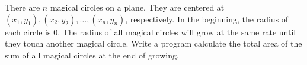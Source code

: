 There are $n$ magical circles on a plane. 
They are centered at $(x_1,y_1), (x_2,y_2), \dots, (x_n, y_n)$, respectively.
In the beginning, the radius of each circle is $0$. 
The radius of all magical circles will grow at the same rate until 
they touch another magical circle. 
Write a program calculate the total area of the sum of all magical 
circles at the end of growing.
